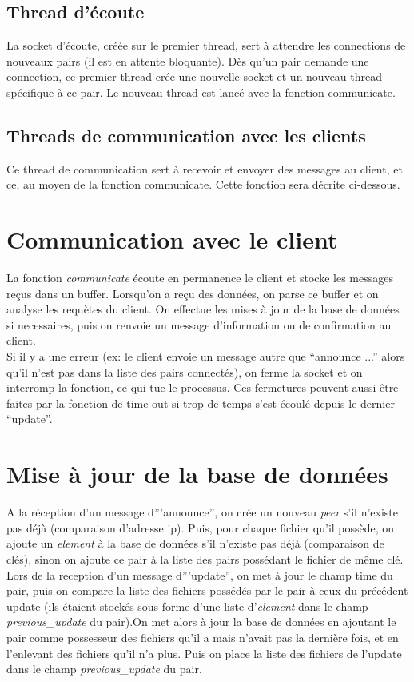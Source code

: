 \subsection{Thread d'écoute}
La socket d'écoute, créée sur le premier thread, sert à attendre les connections de nouveaux pairs (il est en attente bloquante). Dès qu'un pair demande une connection, ce premier thread crée une nouvelle socket et un nouveau thread spécifique à ce pair.
Le nouveau thread est lancé avec la fonction communicate.
\subsection{Threads de communication avec les clients}
Ce thread de communication sert à recevoir et envoyer des messages au client, et ce, au moyen de la fonction communicate. Cette fonction sera décrite ci-dessous.


\section{Communication avec le client}

La fonction \textit{communicate} écoute en permanence le client et stocke les messages reçus dans un buffer. Lorsqu'on a reçu des données, on parse ce buffer et on analyse les requètes du client. On effectue les mises à jour de la base de données si necessaires, puis on renvoie un message d'information ou de confirmation au client. \\
Si il y a une erreur (ex: le client envoie un message autre que ``announce ...'' alors qu'il n'est pas dans la liste des pairs connectés), on ferme la socket et on interromp la fonction, ce qui tue le processus. Ces fermetures peuvent aussi être faites par la fonction de time out si trop de temps s'est écoulé depuis le dernier ``update''.

\section{Mise à jour de la base de données}

A la réception d'un message d'''announce'', on crée un nouveau \textit{peer} s'il n'existe pas déjà (comparaison d'adresse ip). Puis, pour chaque fichier qu'il possède, on ajoute un \textit{element} à la base de données s'il n'existe pas déjà (comparaison de clés), sinon on ajoute ce pair à la liste des pairs possédant le fichier de même clé.\\

Lors de la reception d'un message d'''update'', on met à jour le champ time du pair, puis on compare la liste des fichiers possédés par le pair à ceux du précédent update (ils étaient stockés sous forme d'une liste d'\textit{element} dans le champ \textit{previous\_update} du pair).On met alors à jour la base de données en ajoutant le pair comme possesseur des fichiers qu'il a mais n'avait pas la dernière fois, et en l'enlevant des fichiers qu'il n'a plus. Puis on place la liste des fichiers de l'update dans le champ \textit{previous\_update} du pair. 
